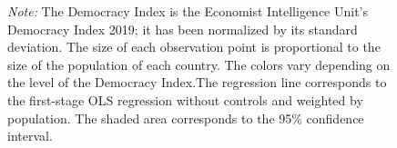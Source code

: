\begin{figure}[H]
  \caption*{ \textit{Note:} The Democracy Index is the Economist Intelligence Unit's Democracy Index 2019; it has been normalized by its standard deviation. The size of each observation point is proportional to the size of the population of each country. The colors vary depending on the level of the Democracy Index.The regression line corresponds to the first-stage OLS regression without controls and weighted by population. The shaded area corresponds to the 95\% confidence interval.}
  
\end{figure}
